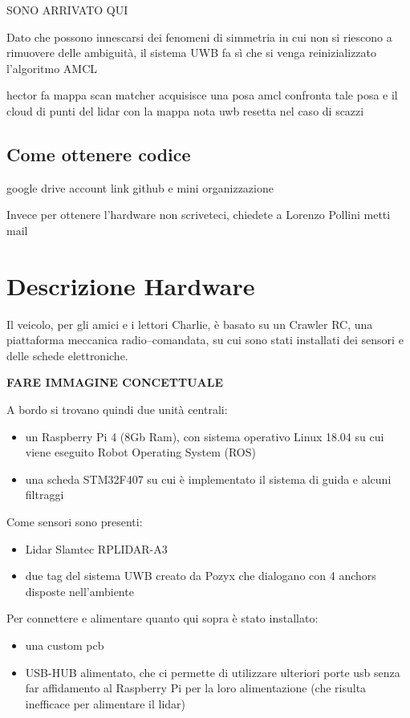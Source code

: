 SONO ARRIVATO QUI


Dato che possono innescarsi dei fenomeni di simmetria in cui non si riescono a rimuovere delle ambiguit\`a, il sistema UWB fa s\`i che si venga reinizializzato l'algoritmo AMCL 


hector fa mappa
scan matcher acquisisce una posa
amcl confronta tale posa e il cloud di punti del lidar con la mappa nota
uwb resetta nel caso di scazzi

\subsection*{Come ottenere codice}
google drive account
link github
e mini organizzazione

Invece per ottenere l'hardware non scriveteci, chiedete a Lorenzo Pollini metti mail

\section{Descrizione Hardware}

Il veicolo, per gli amici e i lettori Charlie, \`e basato su un Crawler RC, una piattaforma meccanica radio--comandata, su cui sono stati installati dei sensori e delle schede elettroniche. 

\textbf{FARE IMMAGINE CONCETTUALE}

A bordo si trovano quindi due unit\`a centrali:
\begin{itemize}
	\item un Raspberry Pi 4 (8Gb Ram), con sistema operativo Linux 18.04 su cui viene eseguito Robot Operating System (ROS)
	\item una scheda STM32F407 su cui è implementato il sistema di guida e alcuni filtraggi
\end{itemize}

Come sensori sono presenti:
\begin{itemize}
	\item Lidar Slamtec RPLIDAR-A3
	
	\item due tag del sistema UWB creato da Pozyx che dialogano con 4 anchors disposte nell'ambiente
\end{itemize}

Per connettere e alimentare quanto qui sopra \`e stato installato:
\begin{itemize}
	\item una custom pcb 
	
	\item USB-HUB alimentato, che ci permette di utilizzare ulteriori porte usb senza far affidamento al Raspberry Pi per la loro alimentazione (che risulta inefficace per alimentare il lidar)
\end{itemize}




